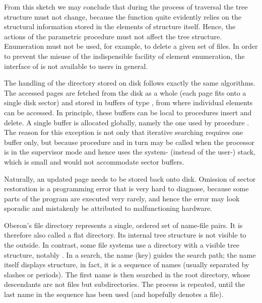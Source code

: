 \noindent From this sketch we may conclude that during the process of traversal the tree structure must not change, because the function  quite evidently relies on the structural information stored in the elements of structure itself. Hence, the actions of the parametric procedure must not affect the tree structure. Enumeration must not be used, for example, to delete a given set of files. In order to prevent the misuse of the indispensible facility of element enumeration, the interface of  is not available to users in general.

The handling of the directory stored on disk follows exactly the same algorithms. The accessed pages are fetched from the disk as a whole (each page fits onto a single disk sector) and stored in buffers of type , from where individual elements can be accessed. In principle, these buffers can be local to procedures insert and delete. A single buffer is allocated globally, namely the one used by procedure . The reason for this exception is not only that iterative searching requires one buffer only, but because procedure  and in turn  may be called when the processor is in the supervisor mode and hence uses the system- (instead of the user-) stack, which is small and would not accommodate sector buffers.

Naturally, an updated page needs to be stored back onto disk. Omission of sector restoration is a programming error that is very hard to diagnose, because some parts of the program are executed very rarely, and hence the error may look sporadic and mistakenly be attributed to malfunctioning hardware.

Oberon's file directory represents a single, ordered set of name-file pairs. It is therefore also called a flat directory. Its internal tree structure is not visible to the outside. In contrast, some file systems use a directory with a visible tree structure, notably . In a search, the name (key) guides the search path; the name itself displays structure, in fact, it is a sequence of names (usually separated by slashes or periods). The first name is then searched in the root directory, whose descendants are not files but subdirectories. The process is repeated, until the last name in the sequence has been used (and hopefully denotes a file).


